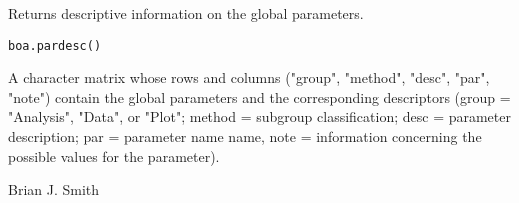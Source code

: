 \begin{Description}\relax
Returns descriptive information on the global parameters.
\end{Description}
\begin{Usage}
\begin{verbatim}
boa.pardesc()
\end{verbatim}
\end{Usage}
\begin{Value}
A character matrix whose rows and columns ("group", "method", "desc", "par", 
"note") contain the global parameters and the corresponding descriptors 
(group = "Analysis", "Data", or "Plot"; method = subgroup classification;
desc = parameter description; par = parameter name name, note = information 
concerning the possible values for the parameter).
\end{Value}
\begin{Author}\relax
Brian J. Smith
\end{Author}
\begin{SeeAlso}\relax
{}
\end{SeeAlso}

